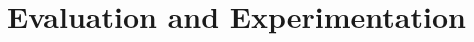 

\chapter{Evaluation and Experimentation}
\label{cha:evaluation_and_experimentation}

\graphicspath{{Chapter6-Evaluation/Figs/}}


